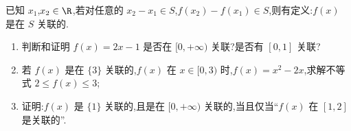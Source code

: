 \begin{problem}
已知 \(x_1\),\(x_2\in \R\),若对任意的 \(x_2-x_1\in S\),\(f(x_2)-f(x_1)\in S\),则有定义:\(f(x)\) 是在 \(S\) 关联的.

\begin{enumerate}
\item 判断和证明 \(f(x)=2x-1\) 是否在 \([0,+\infty)\) 关联?是否有 \([0,1]\) 关联?
\item 若 \(f(x)\) 是在 \(\{3\}\) 关联的,\(f(x)\) 在 \(x\in[0,3)\) 时,\(f(x)=x^2-2x\),求解不等式 \(2\le f(x)\le 3\);
\item 证明:\(f(x)\) 是 \(\{1\}\) 关联的,且是在 \([0,+\infty)\) 关联的,当且仅当``\(f(x)\) 在 \([1,2]\) 是关联的''.
\end{enumerate}
\end{problem}


